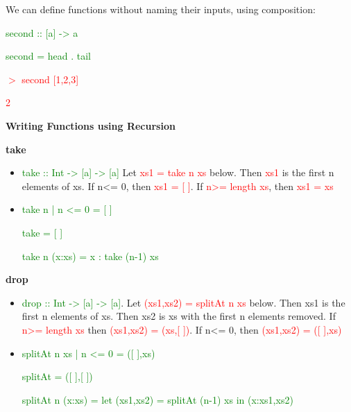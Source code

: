 \documentclass{article}
\begin{document}
We can define functions without naming their inputs, using composition:

\textcolor{green}{second  ::  [a] -> a}

\textcolor{green}{second = head . tail}

\textcolor{red}{$>$ second [1,2,3]}

\textcolor{red}{2}


\textbf{Writing Functions using Recursion}

\textbf{take}

\begin{itemize}
\item \textcolor{green}{take  ::  Int -> [a] -> [a]} Let \textcolor{red}{xs1 = take n xs} below. Then \textcolor{red}{xs1} is the first n elements of xs. If n<= 0, then \textcolor{red}{xs1 = [ ]}. If \textcolor{red}{n>= length xs}, then \textcolor{red}{xs1 = xs}
\item \textcolor{green}{take n  \textunderscore | n <= 0 = [ ]}

\textcolor{green}{take  \textunderscore  [ ] = [ ]}

\textcolor{green}{take  n  (x:xs) = x : take  (n-1)  xs}
\end{itemize}


\textbf{drop}

\begin{itemize}
\item \textcolor{green}{drop  ::  Int -> [a] -> [a]}. Let \textcolor{red}{ (xs1,xs2) = splitAt   n  xs} below. Then xs1 is the first n elements of xs. Then xs2 is xs with the first n elements removed. If \textcolor{red}{n>= length xs} then \textcolor{red}{(xs1,xs2) = (xs,[ ])}. If n<= 0, then \textcolor{red}{(xs1,xs2) = ([ ],xs)}
\item \textcolor{green}{splitAt  n  xs | n <= 0 = ([ ],xs)}

\textcolor{green}{splitAt  \textunderscore  [ ] = ([ ],[ ])}

\textcolor{green}{splitAt  n  (x:xs)
  = let (xs1,xs2) = splitAt  (n-1)  xs
   in (x:xs1,xs2)}
\end{itemize}
\end{document}
